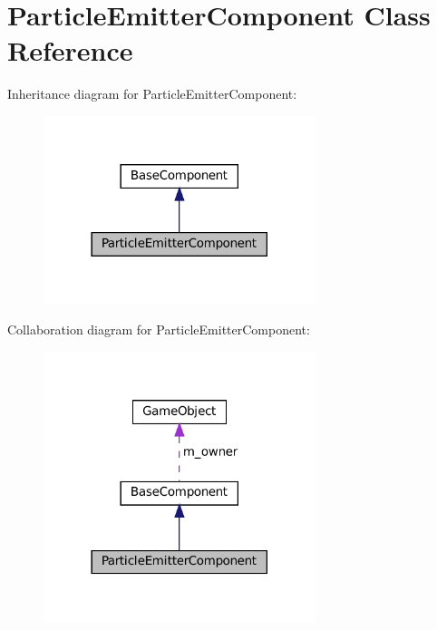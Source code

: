 \hypertarget{classParticleEmitterComponent}{}\section{Particle\+Emitter\+Component Class Reference}
\label{classParticleEmitterComponent}


Inheritance diagram for Particle\+Emitter\+Component\+:
\nopagebreak
\begin{figure}[H]
\begin{center}
\leavevmode
\includegraphics[width=225pt]{classParticleEmitterComponent__inherit__graph}
\end{center}
\end{figure}


Collaboration diagram for Particle\+Emitter\+Component\+:
\nopagebreak
\begin{figure}[H]
\begin{center}
\leavevmode
\includegraphics[width=225pt]{classParticleEmitterComponent__coll__graph}
\end{center}
\end{figure}
